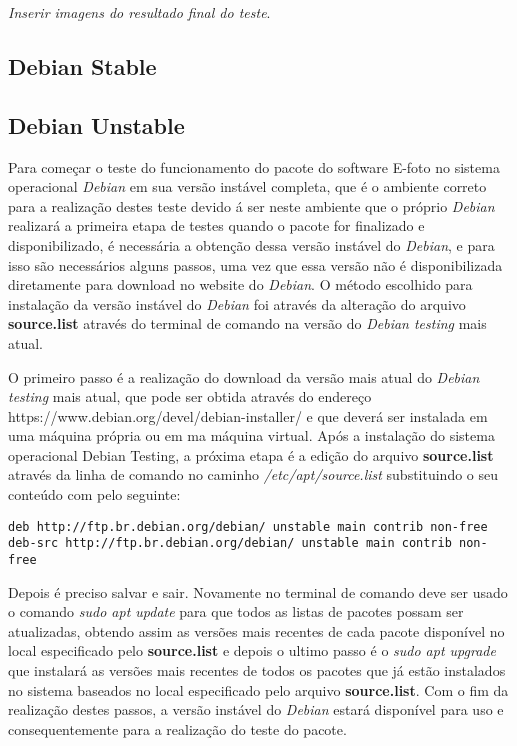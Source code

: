 \textit{Inserir imagens do resultado final do teste}.


\subsection{Debian Stable}

\subsection{Debian Unstable}

Para começar o teste do funcionamento do pacote do software E-foto no sistema operacional \textit{Debian} em sua versão instável completa, que é o ambiente correto para a realização destes teste devido á ser neste ambiente que o próprio \textit{Debian} realizará a primeira etapa de testes quando o pacote for finalizado e disponibilizado, é necessária a obtenção dessa versão instável do \textit{Debian}, e para isso são necessários alguns passos, uma vez que essa versão não é disponibilizada diretamente para download no website do \textit{Debian}. O método escolhido para instalação da versão instável do \textit{Debian} foi através da alteração do arquivo \textbf{source.list} através do terminal de comando na versão do \textit{Debian testing} mais atual. 

O primeiro passo é a realização do download da versão mais atual do \textit{Debian testing} mais atual, que pode ser obtida através do endereço \textit{}https://www.debian.org/devel/debian-installer/ e que deverá ser instalada em uma máquina própria ou em ma máquina virtual. Após a instalação do sistema operacional Debian Testing, a próxima etapa é a edição do arquivo \textbf{source.list} através da linha de comando no caminho \textit{/etc/apt/source.list} substituindo o seu conteúdo com pelo seguinte:
 \begin{verbatim}
deb http://ftp.br.debian.org/debian/ unstable main contrib non-free	
deb-src http://ftp.br.debian.org/debian/ unstable main contrib non-free
\end{verbatim}
Depois é preciso salvar e sair. Novamente no terminal de comando deve ser usado o comando \textit{sudo apt update} para que todos as listas de pacotes possam ser atualizadas, obtendo assim as versões mais recentes de cada pacote disponível no local especificado pelo \textbf{source.list} e depois o ultimo passo é o \textit{sudo apt upgrade} que instalará as versões mais recentes de todos os pacotes que já estão instalados no sistema baseados no local especificado pelo arquivo \textbf{source.list}. Com o fim da realização destes passos, a versão instável do \textit{Debian} estará disponível para uso e consequentemente para a realização do teste do pacote.


